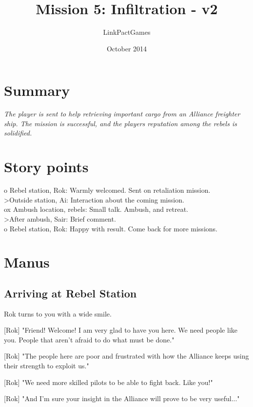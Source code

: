 \documentclass[a4paper,12pt]{article}
\begin{document}
\title{Mission 5: Infiltration - v2}
\author{LinkPactGames}
\date{October 2014}
\maketitle

\section{Summary}

\textit{The player is sent to help retrieving important cargo from an
Alliance freighter ship. The mission is successful, and the
players reputation among the rebels is solidified.}

\section{Story points}

o Rebel station, Rok: Warmly welcomed. Sent on retaliation mission.\\
\textgreater Outside station, Ai: Interaction about the coming mission.\\
ox Ambush location, rebels: Small talk. Ambush, and retreat.\\
\textgreater After ambush, Sair: Brief comment.\\
o Rebel station, Rok: Happy with result. Come back for more missions.\\

\section{Manus}

\subsection{Arriving at Rebel Station}

Rok turns to you with a wide smile. 

[Rok] "Friend! Welcome! I am very glad to have you here. We need people like you.
People that aren't afraid to do what must be done."

[Rok] "The people here are poor and frustrated with how the Alliance keeps using their strength
to exploit us." 

[Rok] "We need more skilled pilots to be able to fight back. Like you!" 

[Rok] "And I'm sure your insight in the Alliance will prove to be very useful..."
\end{document}
